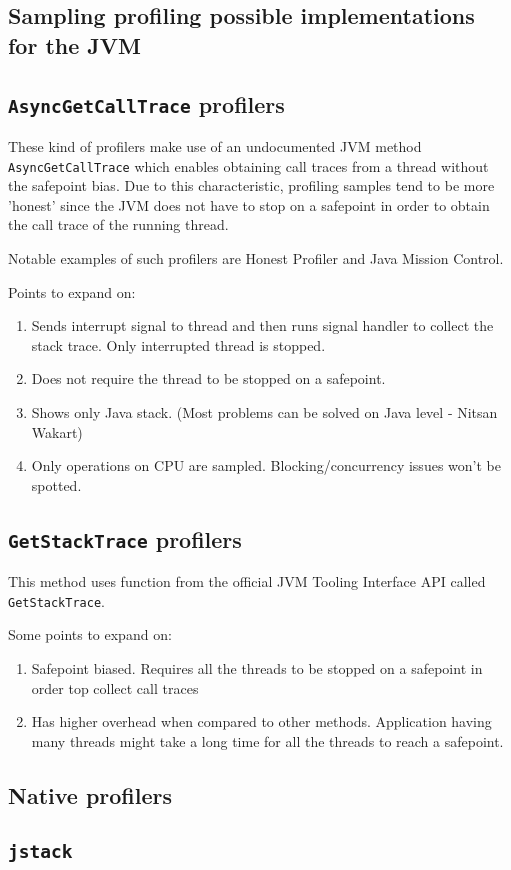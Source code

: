 \documentclass[..thesis.tex]{subfiles}
\begin{document}
\subsection{Sampling profiling possible implementations for the JVM}



\subsection{\texttt{AsyncGetCallTrace} profilers}
These kind of profilers make use of an undocumented JVM method \texttt{Async\-Get\-Call\-Trace} \cite{agct_source} which enables obtaining call traces from a thread without the safepoint bias. Due to this characteristic, profiling samples tend to be more 'honest' since the JVM does not have to stop on a safepoint in order to obtain the call trace of the running thread.

Notable examples of such profilers are Honest Profiler and Java Mission Control. 

Points to expand on:
\begin{enumerate}
	\item Sends interrupt signal to thread and then runs signal handler to collect the stack trace. Only interrupted thread is stopped.
	\item Does not require the thread to be stopped on a safepoint.
	\item Shows only Java stack. (Most problems can be solved on Java level - Nitsan Wakart)
	\item Only operations on CPU are sampled. Blocking/concurrency issues won't be spotted.
\end{enumerate}



\subsection{\texttt{GetStackTrace} profilers}
This method uses function from the official JVM Tooling Interface API \cite{jvmti_doc} called \texttt{GetStackTrace}.

Some points to expand on:
\begin{enumerate}
	\item Safepoint biased. Requires all the threads to be stopped on a safepoint in order top collect call traces
	\item Has higher overhead when compared to other methods. Application having many threads might take a long time for all the threads to reach a safepoint.
\end{enumerate}

\subsection{Native profilers}
\subsection{\texttt{jstack}}
\end{document}
